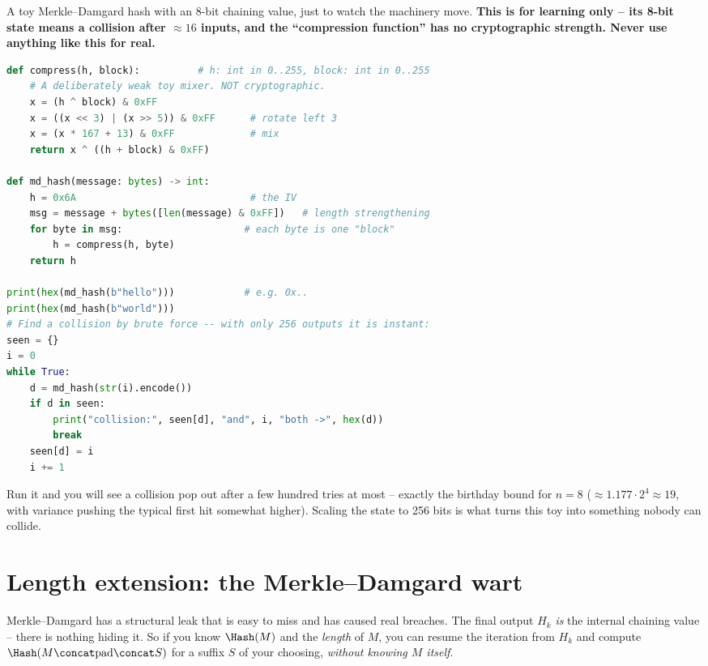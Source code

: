 \begin{implementbox}
A toy Merkle--Damgard hash with an 8-bit chaining value, just to watch the machinery move. \textbf{This is for learning only -- its 8-bit state means a collision after $\approx 16$ inputs, and the ``compression function'' has no cryptographic strength. Never use anything like this for real.}
\begin{lstlisting}[language=Python]
def compress(h, block):          # h: int in 0..255, block: int in 0..255
    # A deliberately weak toy mixer. NOT cryptographic.
    x = (h ^ block) & 0xFF
    x = ((x << 3) | (x >> 5)) & 0xFF      # rotate left 3
    x = (x * 167 + 13) & 0xFF             # mix
    return x ^ ((h + block) & 0xFF)

def md_hash(message: bytes) -> int:
    h = 0x6A                              # the IV
    msg = message + bytes([len(message) & 0xFF])   # length strengthening
    for byte in msg:                     # each byte is one "block"
        h = compress(h, byte)
    return h

print(hex(md_hash(b"hello")))            # e.g. 0x..
print(hex(md_hash(b"world")))
# Find a collision by brute force -- with only 256 outputs it is instant:
seen = {}
i = 0
while True:
    d = md_hash(str(i).encode())
    if d in seen:
        print("collision:", seen[d], "and", i, "both ->", hex(d))
        break
    seen[d] = i
    i += 1
\end{lstlisting}
Run it and you will see a collision pop out after a few hundred tries at most -- exactly the birthday bound for $n = 8$ ($\approx 1.177\cdot 2^{4} \approx 19$, with variance pushing the typical first hit somewhat higher). Scaling the state to 256 bits is what turns this toy into something nobody can collide.
\end{implementbox}

\section{Length extension: the Merkle--Damgard wart}
\label{ch14:length-ext}

Merkle--Damgard has a structural leak that is easy to miss and has caused real breaches. The final output $H_k$ \emph{is} the internal chaining value -- there is nothing hiding it. So if you know $\Hash(M)$ and the \emph{length} of $M$, you can resume the iteration from $H_k$ and compute $\Hash(M \concat \text{pad} \concat S)$ for a suffix $S$ of your choosing, \emph{without knowing $M$ itself}.

